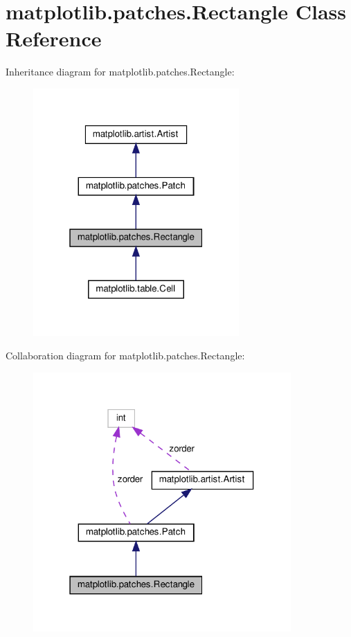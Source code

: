 \hypertarget{classmatplotlib_1_1patches_1_1Rectangle}{}\section{matplotlib.\+patches.\+Rectangle Class Reference}
\label{classmatplotlib_1_1patches_1_1Rectangle}


Inheritance diagram for matplotlib.\+patches.\+Rectangle\+:
\nopagebreak
\begin{figure}[H]
\begin{center}
\leavevmode
\includegraphics[width=223pt]{classmatplotlib_1_1patches_1_1Rectangle__inherit__graph}
\end{center}
\end{figure}


Collaboration diagram for matplotlib.\+patches.\+Rectangle\+:
\nopagebreak
\begin{figure}[H]
\begin{center}
\leavevmode
\includegraphics[width=279pt]{classmatplotlib_1_1patches_1_1Rectangle__coll__graph}
\end{center}
\end{figure}
